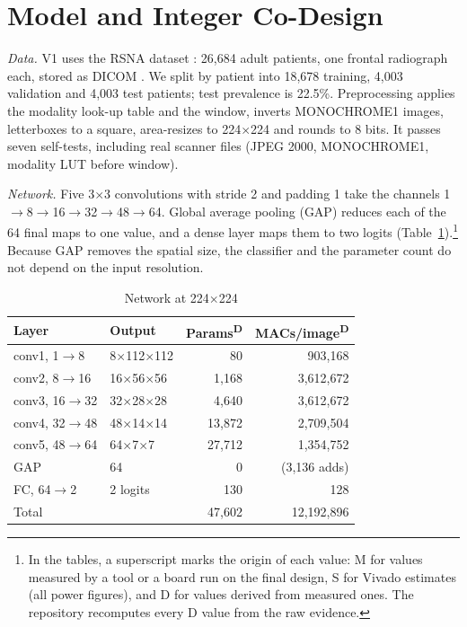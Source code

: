 \documentclass[conference]{IEEEtran}
\newcommand{\deriv}{\textsuperscript{D}}  %
\begin{document}
\section{Model and Integer Co-Design}\label{sec:model}

\textit{Data.} V1 uses the RSNA dataset \cite{shih2019rsna,rsnadata}: 26,684 adult patients, one
frontal radiograph each, stored as DICOM \cite{dicom}. We split by patient into 18,678 training,
4,003 validation and 4,003 test patients; test prevalence is 22.5\%. Preprocessing applies the
modality look-up table and the window, inverts MONOCHROME1 images, letterboxes to a square,
area-resizes to 224$\times$224 and rounds to 8 bits. It passes seven self-tests, including real
scanner files (JPEG 2000, MONOCHROME1, modality LUT before window).

\textit{Network.} Five 3$\times$3 convolutions with stride 2 and padding 1 take the channels
1$\to$8$\to$16$\to$32$\to$48$\to$64. Global average pooling (GAP) reduces each of the 64 final
maps to one value, and a dense layer maps them to two logits (Table~\ref{tab:net}).\footnote{In
the tables, a superscript marks the origin of each value: M for values measured by a tool or a
board run on the final design, S for Vivado estimates (all power figures), and D for values
derived from measured ones. The repository recomputes every D value from the raw evidence.}
Because GAP removes the spatial size, the classifier and the parameter count do not depend on
the input resolution.

\begin{table}[t]
\caption{Network at 224$\times$224}
\label{tab:net}
\centering\footnotesize
\begin{tabular}{@{}llrr@{}}
\toprule
Layer & Output & Params\deriv & MACs/image\deriv \\
\midrule
conv1, 1$\to$8 & 8$\times$112$\times$112 & 80 & 903,168 \\
conv2, 8$\to$16 & 16$\times$56$\times$56 & 1,168 & 3,612,672 \\
conv3, 16$\to$32 & 32$\times$28$\times$28 & 4,640 & 3,612,672 \\
conv4, 32$\to$48 & 48$\times$14$\times$14 & 13,872 & 2,709,504 \\
conv5, 48$\to$64 & 64$\times$7$\times$7 & 27,712 & 1,354,752 \\
GAP & 64 & 0 & (3,136 adds) \\
FC, 64$\to$2 & 2 logits & 130 & 128 \\
\midrule
Total & & 47,602 & 12,192,896 \\
\bottomrule
\end{tabular}
\end{table}
\end{document}
